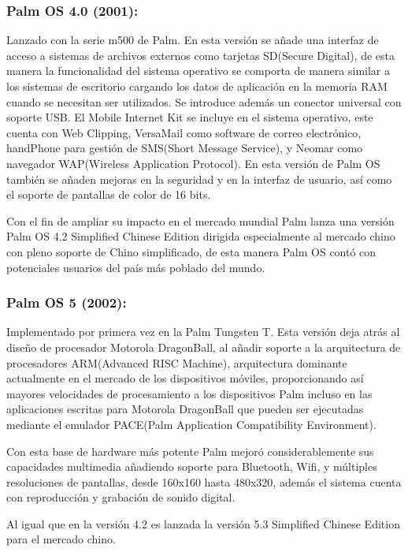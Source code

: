 \subsubsection*{Palm OS 4.0 (2001):}
Lanzado con la serie m500 de Palm. En esta versión se añade una interfaz de acceso a sistemas de archivos externos como tarjetas SD(Secure Digital), de esta manera la 
funcionalidad del sistema operativo se comporta de manera similar a los sistemas de escritorio cargando los datos de aplicación en la memoria RAM cuando se necesitan ser 
utilizados. Se introduce además un conector universal con soporte USB. El Mobile Internet Kit se incluye en el sistema operativo, este cuenta con Web Clipping,  VersaMail como 
software de correo electrónico, handPhone para gestión de SMS(Short Message Service), y Neomar como navegador WAP(Wireless Application Protocol). En esta versión de Palm OS 
también se añaden mejoras en la seguridad y en la interfaz de usuario, así como el soporte de pantallas de color de 16 bits.

Con el fin de ampliar su impacto en el mercado mundial Palm lanza una versión Palm OS 4.2 Simplified Chinese Edition dirigida especialmente al mercado chino con pleno soporte de 
Chino simplificado, de esta manera Palm OS contó con potenciales usuarios del país más poblado del mundo.

\subsubsection*{Palm OS 5 (2002):}
Implementado por primera vez en la Palm Tungsten T. Esta versión deja atrás al diseño de procesador Motorola DragonBall, al añadir soporte a la arquitectura de procesadores 
ARM(Advanced RISC Machine), arquitectura dominante actualmente en el mercado de los dispositivos móviles, proporcionando así mayores velocidades de procesamiento a los 
dispositivos Palm incluso en las aplicaciones escritas para Motorola DragonBall que pueden ser ejecutadas mediante el emulador PACE(Palm Application Compatibility Environment).

Con esta base de hardware más potente Palm mejoró considerablemente sus capacidades multimedia añadiendo soporte para Bluetooth, Wifi, y múltiples resoluciones de pantallas, 
desde 160x160 hasta 480x320, además el sistema cuenta con reproducción y grabación de sonido digital.

Al igual que en la versión 4.2 es lanzada la versión 5.3 Simplified Chinese Edition para el mercado chino.

